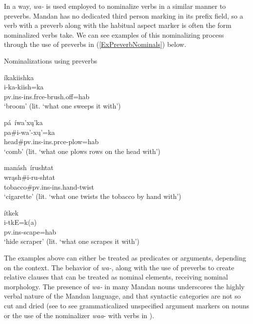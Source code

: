 In a way, \textit{wa-} is used employed to nominalize verbs in a similar manner to preverbs. Mandan has no dedicated third person marking in its prefix field, so a verb with a preverb along with the habitual aspect marker is often the form nominalized verbs take. We can see examples of this nominalizing process through the use of preverbs in (\ref{ExPreverbNominals}) below.

\begin{exe}
\item\label{ExPreverbNominals} Nominalizations using preverbs

	\begin{xlist}
	
	\item \glll íkakiishka\\
	i-ka-kiish=ka\\
	pv.ins-ins.frce-\textnormal{brush.off}=hab\\
	\glt `broom' (lit. `what one sweeps it with') \citep[112]{hollow1970}
	
	\item \glll pá~íwa'xų'ka\\
	pa\#i-wa'-xų'=ka\\
	\textnormal{head}\#pv.ins-ins.prce-\textnormal{plow}=hab\\
	\glt `comb' (lit. `what one plows rows on the head with') \citep[142]{hollow1970}
	
	\item \glll manásh~írushtat\\
	wrąsh\#i-ru-shtat\\
	\textnormal{tobacco}\#pv.ins-ins.hand-\textnormal{twist}\\
	\glt `cigarette' (lit. `what one twists the tobacco by hand with') \citep[238]{hollow1970}
	
	\item \glll ítkek\\
	i-tkE=k(a)\\
	pv.ins-\textnormal{scape}=hab\\
	\glt `hide scraper' (lit. `what one scrapes it with') \citep[253]{hollow1970}
	
	\end{xlist}

\end{exe}

The examples above can either be treated as predicates or arguments, depending on the context. The behavior of \textit{wa-}, along with the use of preverbs to create relative clauses that can be treated as nominal elements, receiving nominal morphology. The presence of \textit{wa-} in many Mandan nouns underscores the highly verbal nature of the Mandan language, and that syntactic categories are not so cut and dried (see  to see grammaticalized unspecified argument markers on nouns or the use of the nominalizer \textit{waa}- with verbs in ).

